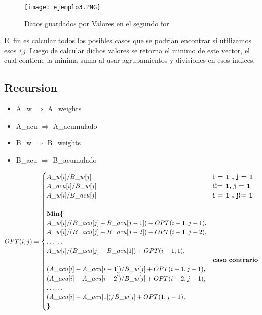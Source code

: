 \documentclass[12pt]{article}
\begin{document}
 
 \begin{figure}[h]
		 \centering
		 \texttt{[image: ejemplo3.PNG]}
		 \caption{Datos guardados por Valores en el segundo for}
 \end{figure}

 El fin es calcular todos los posibles casos que se podrian encontrar si utilizamos esos \textit{i,j}. Luego de calcular dichos valores se retorna el minimo de este vector, el cual contiene la minima suma al usar agrupamientos y divisiones en esos indices.


\subsection{Recursion}
 \begin{itemize}
		 \item A\_w $\Rightarrow$ A\_weights
		 \item A\_acu $\Rightarrow$ A\_acumulado
		 \item B\_w $\Rightarrow$ B\_weights
		 \item B\_acu $\Rightarrow$ B\_acumulado
 \end{itemize}

\begin{equation*}
OPT(i,j) =
\begin{cases}
		A\_w[i]/B\_w[j] & \textbf{\text{i = 1 , j = 1}}\\
		A\_acu[i]/B\_w[j] & \textbf{\text{i!= 1, j = 1}}\\
		A\_w[i]/B\_acu[j] & \textbf{\text{i = 1 , j!= 1}}\\
\\
\textbf{Min\{ } &\\
		A\_w[i]/(B\_acu[j] - B\_acu[j-1]) + OPT(i-1,j-1), &\\
		A\_w[i]/(B\_acu[j] - B\_acu[j-2]) + OPT(i-1,j-2),  &\\
		\dots  \dots  &\\
		A\_w[i]/(B\_acu[j] - B\_acu[1]) + OPT(i-1,1), &\\
		& \textbf{\text{caso contrario}}\\
		(A\_acu[i] - A\_acu[i-1])/B\_w[j] + OPT(i-1,j-1), &\\
		(A\_acu[i] - A\_acu[i-2])/B\_w[j] + OPT(i-2,j-1), &\\
		\dots \dots &\\
		(A\_acu[i] - A\_acu[1])/B\_w[j] + OPT(1,j-1), &\\
\textbf{\}} \\
\end{cases}
\end{equation*}
\end{document}
